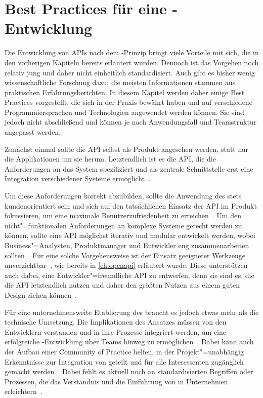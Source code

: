 \chapter{Best Practices für eine \AF-Entwicklung}
Die Entwicklung von \acp{API} nach dem \AF-Prinzip bringt viele Vorteile mit sich, die in den vorherigen Kapiteln bereits erläutert wurden.
Dennoch ist das Vorgehen noch relativ jung und daher nicht einheitlich standardisiert.
Auch gibt es bisher wenig wissenschaftliche Forschung dazu; die meisten Informationen stammen aus praktischen Erfahrungsberichten.
In diesem Kapitel werden daher einige Best Practices vorgestellt, die sich in der Praxis bewährt haben und auf verschiedene Programmiersprachen und Technologien angewendet werden können.
Sie sind jedoch nicht abschließend und können je nach Anwendungsfall und Teamstruktur angepasst werden.

Zunächst einmal sollte die \ac{API} selbst als Produkt angesehen werden, statt nur die Applikationen um sie herum.
Letztendlich ist es die \ac{API}, die die Anforderungen an das System spezifiziert und als zentrale Schnittstelle erst eine Integration verschiedener Systeme ermöglicht~\cite[350]{de23}.

Um diese Anforderungen korrekt abzubilden, sollte die Anwendung des \AFAes stets kundenorientiert sein und sich auf den tatsächlichen Einsatz der \ac{API} im Produkt fokussieren, um eine maximale Benutzerzufriedenheit zu erreichen~\cite[1627]{cha21}.
Um den nicht"=funktionalen Anforderungen an komplexe Systeme gerecht werden zu können, sollte eine \ac{API} möglichst iterativ und modular entwickelt werden, wobei Business"=Analysten, Produktmanager und Entwickler eng zusammenarbeiten sollten~\cite[352]{de23}.
Für eine solche Vorgehensweise ist der Einsatz geeigneter Werkzeuge unverzichtbar~\cite[1628]{cha21}, wie bereits in \autoref{ch:openapi} erläutert wurde.
Diese unterstützen auch dabei, eine Entwickler"=freundliche \ac{API} zu entwerfen, denn sie sind es, die die \ac{API} letztendlich nutzen und daher den größten Nutzen aus einem guten Design ziehen können~\cite[355]{de23}.

Für eine unternehmensweite Etablierung des \AFAes braucht es jedoch etwas mehr als die technische Umsetzung.
Die Implikationen des Ansatzes müssen von den Entwicklern verstanden und in ihre Prozesse integriert werden, um eine erfolgreiche \AF-Entwicklung über Teams hinweg zu ermöglichen~\cite[359]{de23}.
Dabei kann auch der Aufbau einer Community of Practice helfen, in der Projekt"=unabhängig Erkenntnisse zur Integration von \AF geteilt und für alle Interessenten zugänglich gemacht werden~\cite[4]{kul23}.
Dabei fehlt es aktuell noch an standardisierten Begriffen oder Prozessen, die das Verständnis und die Einführung von \AF in Unternehmen erleichtern~\cites[77]{bea22}[2]{kul23}.

